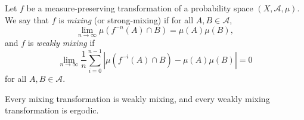 \documentclass[12pt]{article}
\begin{document}
Let $f$ be a measure-preserving transformation of a probability space $(X,\mathscr{A},\mu)$. We say that $f$ is \emph{mixing} (or strong-mixing) if for all $A,B\in\mathscr{A}$, 
$$\lim_{n\to\infty} \mu(f^{-n}(A)\cap B) = \mu(A)\mu(B),$$
and $f$ is \emph{weakly mixing} if 
$$\lim_{n\to\infty} \frac{1}{n}\sum_{i=0}^{n-1}|\mu(f^{-i}(A)\cap B)-\mu(A)\mu(B)| = 0$$
for all $A,B\in\mathscr{A}$.

Every mixing transformation is weakly mixing, and every weakly mixing transformation is ergodic.
\end{document}

